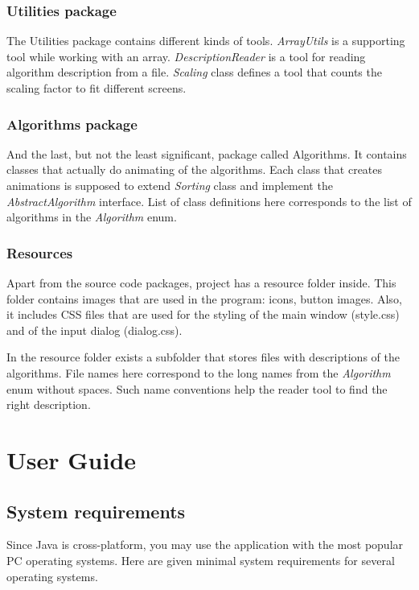 \documentclass[
  field=inf,
  biblatex,
  language=english,
  glossaries,
  theorems=false,
  index
]{kidiplom}
\begin{document}
\subsubsection{Utilities package}
The Utilities package contains different kinds of tools. \textit{ArrayUtils} is a supporting tool while working with an array. \textit{DescriptionReader} is a tool for reading algorithm description from a file. \textit{Scaling} class defines a tool that counts the scaling factor to fit different screens.

\subsubsection{Algorithms package}
And the last, but not the least significant, package called Algorithms. It contains classes that actually do animating of the algorithms. Each class that creates animations is supposed to extend \textit{Sorting} class and implement the \textit{AbstractAlgorithm} interface. List of class definitions here corresponds to the list of algorithms in the \textit{Algorithm} enum.

\subsubsection{Resources}
Apart from the source code packages, project has a resource folder inside. This folder contains images that are used in the program: icons, button images. Also, it includes \Gls{CSS} files that are used for the styling of the main window (style.css) and of the input dialog (dialog.css).

In the resource folder exists a subfolder that stores files with descriptions of the algorithms. File names here correspond to the long names from the \textit{Algorithm} enum without spaces. Such name conventions help the reader tool to find the right description.

\newpage
\section{User Guide}

\subsection{System requirements}

Since Java is cross-platform, you may use the application with the most popular PC operating systems. Here are given minimal system requirements for several operating systems.
\end{document}
